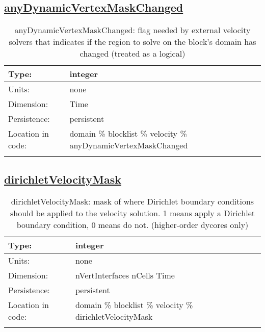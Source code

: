 \subsection[anyDynamicVertexMaskChanged]{\hyperref[sec:var_tab_velocity]{anyDynamicVertexMaskChanged}}
\label{subsec:var_sec_velocity_anyDynamicVertexMaskChanged}
\begin{center}
\begin{longtable}{| p{2.0in} | p{4.0in} |}
        \hline 
        Type: & integer \\
        \hline 
        Units: & \si{none} \\
        \hline 
        Dimension: & Time \\
        \hline 
        Persistence: & persistent \\
        \hline 
         Location in code: & domain \% blocklist \% velocity \% anyDynamicVertexMaskChanged \\
         \hline 
    \caption{anyDynamicVertexMaskChanged: flag needed by external velocity solvers that indicates if the region to solve on the block's domain has changed (treated as a logical)}
\end{longtable}
\end{center}
\subsection[dirichletVelocityMask]{\hyperref[sec:var_tab_velocity]{dirichletVelocityMask}}
\label{subsec:var_sec_velocity_dirichletVelocityMask}
\begin{center}
\begin{longtable}{| p{2.0in} | p{4.0in} |}
        \hline 
        Type: & integer \\
        \hline 
        Units: & \si{none} \\
        \hline 
        Dimension: & nVertInterfaces nCells Time \\
        \hline 
        Persistence: & persistent \\
        \hline 
         Location in code: & domain \% blocklist \% velocity \% dirichletVelocityMask \\
         \hline 
    \caption{dirichletVelocityMask: mask of where Dirichlet boundary conditions should be applied to the velocity solution.  1 means apply a Dirichlet boundary condition, 0 means do not. (higher-order dycores only)}
\end{longtable}
\end{center}
